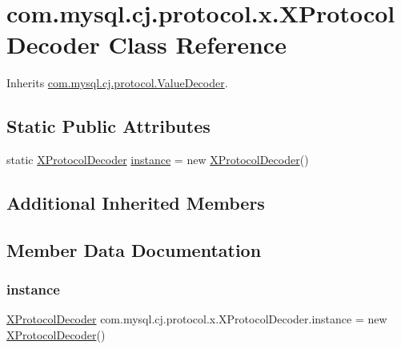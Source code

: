 \hypertarget{classcom_1_1mysql_1_1cj_1_1protocol_1_1x_1_1_x_protocol_decoder}{}\section{com.\+mysql.\+cj.\+protocol.\+x.\+X\+Protocol\+Decoder Class Reference}
\label{classcom_1_1mysql_1_1cj_1_1protocol_1_1x_1_1_x_protocol_decoder}


Inherits \mbox{\hyperlink{interfacecom_1_1mysql_1_1cj_1_1protocol_1_1_value_decoder}{com.\+mysql.\+cj.\+protocol.\+Value\+Decoder}}.

\subsection*{Static Public Attributes}
\begin{DoxyCompactItemize}
\item 
static \mbox{\hyperlink{classcom_1_1mysql_1_1cj_1_1protocol_1_1x_1_1_x_protocol_decoder}{X\+Protocol\+Decoder}} \mbox{\hyperlink{classcom_1_1mysql_1_1cj_1_1protocol_1_1x_1_1_x_protocol_decoder_a33586fad8de270f9c09836b1ebff14bb}{instance}} = new \mbox{\hyperlink{classcom_1_1mysql_1_1cj_1_1protocol_1_1x_1_1_x_protocol_decoder}{X\+Protocol\+Decoder}}()
\end{DoxyCompactItemize}
\subsection*{Additional Inherited Members}


\subsection{Member Data Documentation}
\mbox{\label{classcom_1_1mysql_1_1cj_1_1protocol_1_1x_1_1_x_protocol_decoder_a33586fad8de270f9c09836b1ebff14bb}} 
\subsubsection{\texorpdfstring{instance}{instance}}
{\footnotesize\ttfamily \mbox{\hyperlink{classcom_1_1mysql_1_1cj_1_1protocol_1_1x_1_1_x_protocol_decoder}{X\+Protocol\+Decoder}} com.\+mysql.\+cj.\+protocol.\+x.\+X\+Protocol\+Decoder.\+instance = new \mbox{\hyperlink{classcom_1_1mysql_1_1cj_1_1protocol_1_1x_1_1_x_protocol_decoder}{X\+Protocol\+Decoder}}()\hspace{0.3cm}{\ttfamily [static]}}



